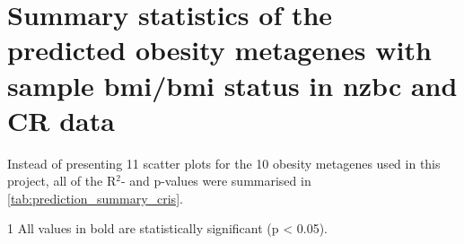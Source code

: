 	\newpage

	\section{Summary statistics of the predicted obesity metagenes with sample \gls{bmi}/\gls{bmi} status in \gls{nzbc} and CR data}
	\label{sec:summary_statistics_of_the_predicted_obesity_metagenes_with_sample_bmi_bmi_status_in_nzbc_and_cr_data}

	Instead of presenting 11 scatter plots for the 10 obesity metagenes used in this project, all of the R$^2$- and p-values were summarised in \cref{tab:prediction_summary_cris}.

	\begin{ThreePartTable}
			\begin{TableNotes}
				\begin{footnotesize}
				\item [1] All values in bold are statistically significant (p \textless{} 0.05).
				\end{footnotesize}
			\end{TableNotes}
		

\end{ThreePartTable}
